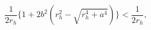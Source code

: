 \begin{equation} 
\frac{1}{2r_h} \{1+2b^2(r_{h}^2- \sqrt{r_{h}^4+a^4}) \} < \frac{1}{2r_h},
\label{kappa}
\end{equation}

